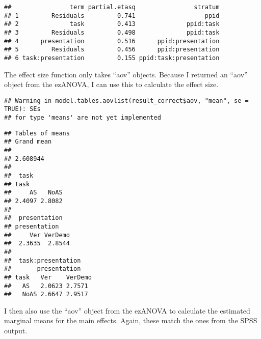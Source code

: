 \documentclass[]{article}
\newenvironment{Shaded}{\begin{snugshade}}{\end{snugshade}}
\newcommand{\KeywordTok}[1]{\textcolor[rgb]{0.13,0.29,0.53}{\textbf{#1}}}
\newcommand{\DataTypeTok}[1]{\textcolor[rgb]{0.13,0.29,0.53}{#1}}
\newcommand{\StringTok}[1]{\textcolor[rgb]{0.31,0.60,0.02}{#1}}
\newcommand{\OtherTok}[1]{\textcolor[rgb]{0.56,0.35,0.01}{#1}}
\newcommand{\OperatorTok}[1]{\textcolor[rgb]{0.81,0.36,0.00}{\textbf{#1}}}
\newcommand{\NormalTok}[1]{#1}
\begin{document}
\begin{verbatim}
##                term partial.etasq                stratum
## 1         Residuals         0.741                   ppid
## 2              task         0.413              ppid:task
## 3         Residuals         0.498              ppid:task
## 4      presentation         0.516      ppid:presentation
## 5         Residuals         0.456      ppid:presentation
## 6 task:presentation         0.155 ppid:task:presentation
\end{verbatim}

The effect size function only takes ``aov'' objects. Because I returned
an ``aov'' object from the ezANOVA, I can use this to calculate the
effect size.

\begin{Shaded}
\end{Shaded}

\begin{verbatim}
## Warning in model.tables.aovlist(result_correct$aov, "mean", se = TRUE): SEs
## for type 'means' are not yet implemented
\end{verbatim}

\begin{verbatim}
## Tables of means
## Grand mean
##          
## 2.608944 
## 
##  task 
## task
##     AS   NoAS 
## 2.4097 2.8082 
## 
##  presentation 
## presentation
##     Ver VerDemo 
##  2.3635  2.8544 
## 
##  task:presentation 
##       presentation
## task   Ver    VerDemo
##   AS   2.0623 2.7571 
##   NoAS 2.6647 2.9517
\end{verbatim}

I then also use the ``aov'' object from the ezANOVA to calculate the
estimated marginal means for the main effects. Again, these match the
ones from the SPSS output.
\end{document}
